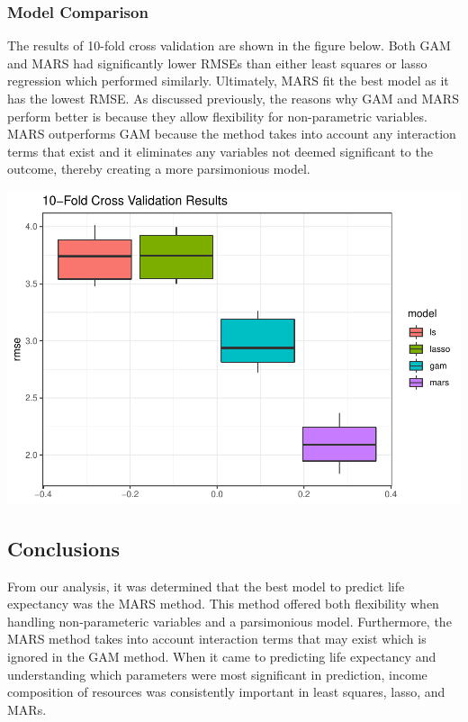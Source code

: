 \documentclass[]{article}
\begin{document}
\subsubsection{Model Comparison}\label{model-comparison}

The results of 10-fold cross validation are shown in the figure below.
Both GAM and MARS had significantly lower RMSEs than either least
squares or lasso regression which performed similarly. Ultimately, MARS
fit the best model as it has the lowest RMSE. As discussed previously,
the reasons why GAM and MARS perform better is because they allow
flexibility for non-parametric variables. MARS outperforms GAM because
the method takes into account any interaction terms that exist and it
eliminates any variables not deemed significant to the outcome, thereby
creating a more parsimonious model.

\includegraphics{midterm_project_report_files/figure-latex/unnamed-chunk-4-1.pdf}

\subsection{Conclusions}\label{conclusions}

From our analysis, it was determined that the best model to predict life
expectancy was the MARS method. This method offered both flexibility
when handling non-parameteric variables and a parsimonious model.
Furthermore, the MARS method takes into account interaction terms that
may exist which is ignored in the GAM method. When it came to predicting
life expectancy and understanding which parameters were most significant
in prediction, income composition of resources was consistently
important in least squares, lasso, and MARs.
\end{document}
